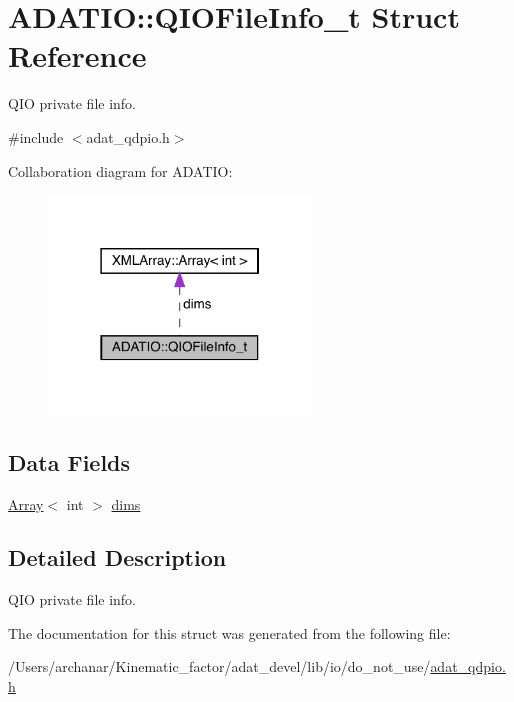 \hypertarget{structADATIO_1_1QIOFileInfo__t}{}\section{A\+D\+A\+T\+IO\+:\+:Q\+I\+O\+File\+Info\+\_\+t Struct Reference}
\label{structADATIO_1_1QIOFileInfo__t}


Q\+IO private file info.  




{\ttfamily \#include $<$adat\+\_\+qdpio.\+h$>$}



Collaboration diagram for A\+D\+A\+T\+IO\+:\nopagebreak
\begin{figure}[H]
\begin{center}
\leavevmode
\includegraphics[width=198pt]{d0/d51/structADATIO_1_1QIOFileInfo__t__coll__graph}
\end{center}
\end{figure}
\subsection*{Data Fields}
\begin{DoxyCompactItemize}
\item 
\mbox{\hyperlink{classXMLArray_1_1Array}{Array}}$<$ int $>$ \mbox{\hyperlink{group__qio_ga29f30bb416493194287e2a1314e99c86}{dims}}
\end{DoxyCompactItemize}


\subsection{Detailed Description}
Q\+IO private file info. 

The documentation for this struct was generated from the following file\+:\begin{DoxyCompactItemize}
\item 
/\+Users/archanar/\+Kinematic\+\_\+factor/adat\+\_\+devel/lib/io/do\+\_\+not\+\_\+use/\mbox{\hyperlink{adat__qdpio_8h}{adat\+\_\+qdpio.\+h}}\end{DoxyCompactItemize}
